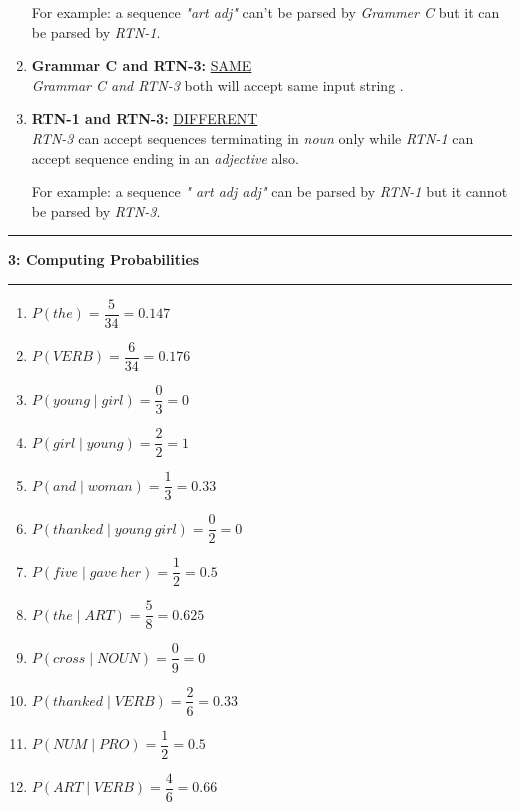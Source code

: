 \documentclass[11pt]{article}
\newcommand\question[2]{\vspace{.25in}\hrule\textbf{#1: #2}\vspace{.5em}\hrule\vspace{.10in}}
\begin{document}
\begin{enumerate}
For example: a sequence \textit{"art adj"} can't be parsed by \textit{Grammer C} but it can be parsed by \textit{RTN-1}.

\item \textbf{Grammar C and RTN-3:} \underline {SAME}
\\ \textit{Grammar C and RTN-3} both will accept same input string . 

\item \textbf{RTN-1 and RTN-3:} \underline {DIFFERENT}
\\\textit{RTN-3} can accept sequences terminating in   \textit{noun} only while \textit{RTN-1} can accept sequence ending in an \textit{adjective} also. 

For example: a sequence \textit{" art adj adj"} can be parsed by \textit{RTN-1} but it cannot be parsed by \textit{RTN-3}.

\end{enumerate}
\newpage
\question{3}{Computing Probabilities}
\begin{enumerate}

\item $P(the)=\dfrac{5}{34}=0.147$

\item $P(VERB)=\dfrac{6}{34}=0.176$ 

\item $P(young \mid girl)=\dfrac{0}{3}=0$

\item $P(girl \mid young)=\dfrac{2}{2}=1$

\item $P(and \mid woman)=\dfrac{1}{3}=0.33$

\item $P(thanked \mid young~girl)=\dfrac{0}{2}=0$

\item $P(five \mid gave~her)=\dfrac{1}{2}=0.5$

\item $P(the \mid ART)=\dfrac{5}{8}=0.625$

\item $P(cross \mid NOUN)=\dfrac{0}{9}=0$

\item $P(thanked \mid VERB)=\dfrac{2}{6}=0.33$

\item $P(NUM \mid PRO)=\dfrac{1}{2}=0.5$ 

\item $P(ART \mid VERB)=\dfrac{4}{6}=0.66$
  
\end{enumerate}
\end{document}
